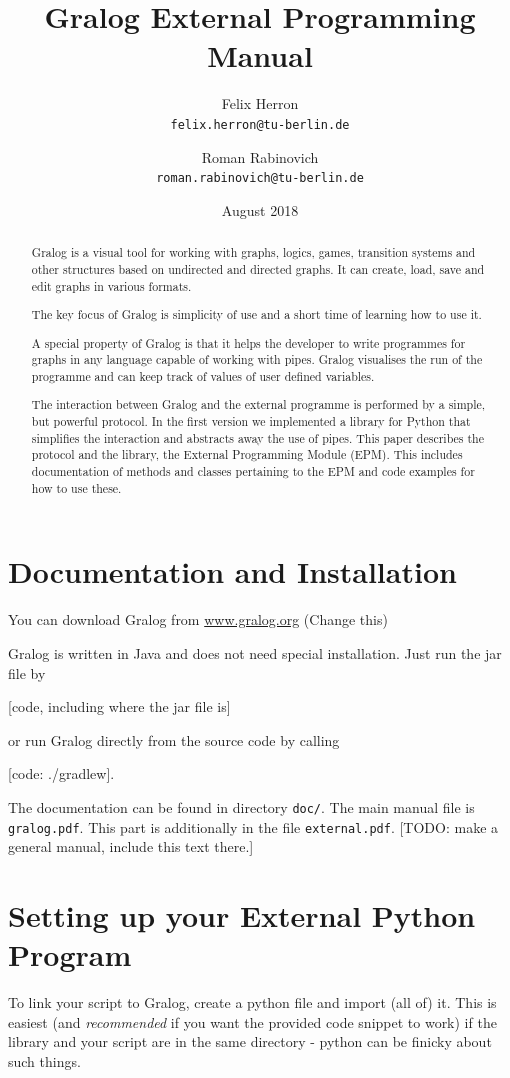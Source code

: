 \documentclass{article}
\title{Gralog External Programming Manual}
\author{Felix Herron\\\texttt{felix.herron@tu-berlin.de} \and Roman
  Rabinovich\\ \texttt{roman.rabinovich@tu-berlin.de}}
\date{August 2018}
\newcounter{example}
\begin{document}
\maketitle


\begin{abstract}
Gralog is a visual tool for working with graphs, logics, games,
transition systems and other structures based on undirected and
directed graphs. It can create, load, save and edit graphs in
various formats.

The key focus of Gralog is simplicity of use and a short time of
learning how to use it.

A special property of Gralog is that it helps the developer to write
programmes for graphs in any language capable of working with
pipes. Gralog visualises the run of the programme and can keep track
of values of user defined variables.

The interaction between Gralog and the external programme is
performed by a simple, but powerful protocol. In the first version
we implemented a library for Python that simplifies the interaction
and abstracts away the use of pipes. This paper describes the
protocol and the library, the External Programming Module (EPM). This
includes documentation of methods and classes pertaining to the
EPM and code examples for how to use these.
\end{abstract}

\section{Documentation and Installation}

You can download Gralog from \url{www.gralog.org} (Change this)

Gralog is written in Java and does not need special installation. Just
run the jar file by

[code, including where the jar file is]

or run Gralog directly from the source code by calling

[code: ./gradlew].

The documentation can be found in directory \texttt{doc/}. The main
manual file is \texttt{gralog.pdf}. This part is additionally in the
file \texttt{external.pdf}. [TODO: make a general manual, include this
text there.]



\section{Setting up your External Python Program}
To link your script to Gralog, create a python file and import (all of) it. This is easiest (and \textit{recommended} if you want the provided code snippet to work) if the library and your script are in the same directory - python can be finicky about such things.\\
\end{document}
